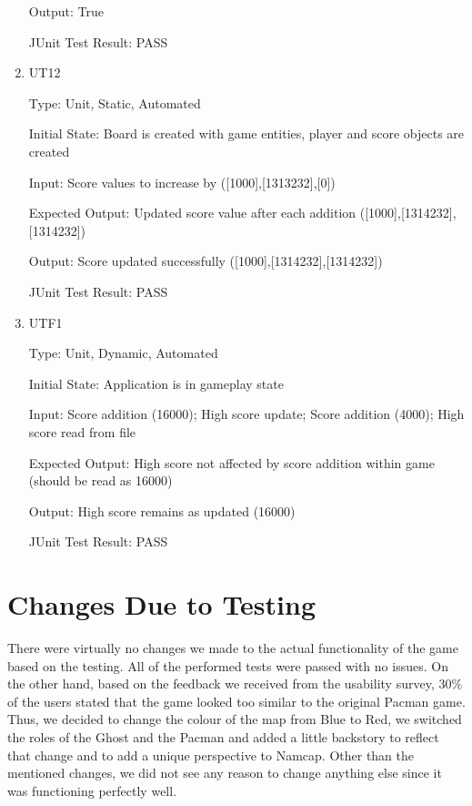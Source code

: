 \documentclass[12pt, titlepage]{article}
\begin{document}
\begin{enumerate}
Output: True

JUnit Test Result: PASS

\item{\label{ut12}{UT12}\\}

Type: Unit, Static, Automated
					
Initial State: Board is created with game entities, player and score objects are created
					
Input: Score values to increase by ([1000],[1313232],[0])
					
Expected Output: Updated score value after each addition ([1000],[1314232],[1314232])
					
Output: Score updated successfully ([1000],[1314232],[1314232])

JUnit Test Result: PASS

\item{\label{utf1}{UTF1}\\}

Type: Unit, Dynamic, Automated
					
Initial State: Application is in gameplay state
					
Input: Score addition (16000); High score update; Score addition (4000); High score read from file
					
Expected Output: High score not affected by score addition within game (should be read as 16000)
					
Output: High score remains as updated (16000)

JUnit Test Result: PASS

\end{enumerate}

\section{Changes Due to Testing}

There were virtually no changes we made to the actual functionality of the game based on the testing. All of the performed tests were passed with no issues. On the other hand, based on the feedback we received from the usability survey, 30\% of the users stated that the game looked too similar to the original Pacman game. Thus, we decided to change the colour of the map from Blue to Red, we switched the roles of the Ghost and the Pacman and added a little backstory to reflect that change and to add a unique perspective to Namcap. Other than the mentioned changes, we did not see any reason to change anything else since it was functioning perfectly well.
\end{document}
